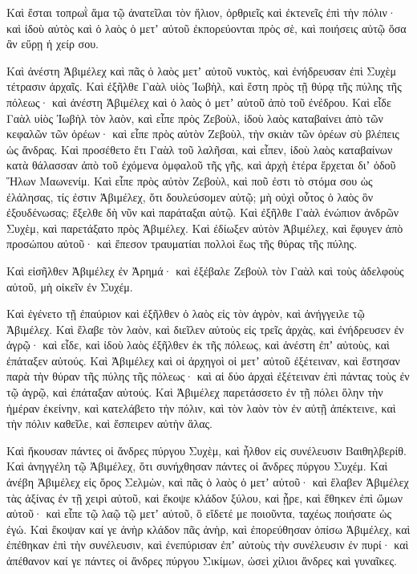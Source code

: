 {Καὶ ἔσται τοπρωῒ ἅμα τῷ ἀνατεῖλαι τὸν ἥλιον, ὀρθριεῖς καὶ ἐκτενεῖς ἐπὶ τὴν πόλιν· καὶ ἰδοὺ αὐτὸς καὶ ὁ λαὸς ὁ μετʼ αὐτοῦ ἐκπορεύονται πρὸς σὲ, καὶ ποιήσεις αὐτῷ ὅσα ἂν εὕρῃ ἡ χείρ σου.
\par }{\PP {}Καὶ ἀνέστη Ἀβιμέλεχ καὶ πᾶς ὁ λαὸς μετʼ αὐτοῦ νυκτὸς, καὶ ἐνήδρευσαν ἐπὶ Συχὲμ τέτρασιν ἀρχαῖς.
Καὶ ἐξῆλθε Γαὰλ υἱὸς Ἰωβὴλ, καὶ ἔστη πρὸς τῇ θύρᾳ τῆς πύλης τῆς πόλεως· καὶ ἀνέστη Ἀβιμέλεχ καὶ ὁ λαὸς ὁ μετʼ αὐτοῦ ἀπὸ τοῦ ἐνέδρου.
Καὶ εἶδε Γαὰλ υἱὸς Ἰωβὴλ τὸν λαὸν, καὶ εἶπε πρὸς Ζεβοὺλ, ἰδοὺ λαὸς καταβαίνει ἀπὸ τῶν κεφαλῶν τῶν ὀρέων· καὶ εἶπε πρὸς αὐτὸν Ζεβοὺλ, τὴν σκιὰν τῶν ὀρέων σὺ βλέπεις ὡς ἄνδρας.
Καὶ προσέθετο ἔτι Γαὰλ τοῦ λαλῆσαι, καὶ εἶπεν, ἰδοὺ λαὸς καταβαίνων κατὰ θάλασσαν ἀπὸ τοῦ ἐχόμενα ὀμφαλοῦ τῆς γῆς, καὶ ἀρχὴ ἑτέρα ἔρχεται διʼ ὁδοῦ Ἥλων Μαωνενίμ.
Καὶ εἶπε πρὸς αὐτὸν Ζεβοὺλ, καὶ ποῦ ἐστι τὸ στόμα σου ὡς ἐλάλησας, τίς ἐστιν Ἀβιμέλεχ, ὅτι δουλεύσομεν αὐτῷ; μὴ οὐχὶ οὗτος ὁ λαὸς ὃν ἐξουδένωσας; ἔξελθε δὴ νῦν καὶ παράταξαι αὐτῷ.
Καὶ ἐξῆλθε Γαὰλ ἐνώπιον ἀνδρῶν Συχὲμ, καὶ παρετάξατο πρὸς Ἀβιμέλεχ.
Καὶ ἐδίωξεν αὐτὸν Ἀβιμέλεχ, καὶ ἔφυγεν ἀπὸ προσώπου αὐτοῦ· καὶ ἔπεσον τραυματίαι πολλοὶ ἕως τῆς θύρας τῆς πύλης.
\par }{\PP {}Καὶ εἰσῆλθεν Ἀβιμέλεχ ἐν Ἀρημά· καὶ ἐξέβαλε Ζεβοὺλ τὸν Γαὰλ καὶ τοὺς ἀδελφοὺς αὐτοῦ, μὴ οἰκεῖν ἐν Συχέμ.
\par }{\PP {}Καὶ ἐγένετο τῇ ἐπαύριον καὶ ἐξῆλθεν ὁ λαὸς εἰς τὸν ἀγρὸν, καὶ ἀνήγγειλε τῷ Ἀβιμέλεχ.
Καὶ ἔλαβε τὸν λαὸν, καὶ διεῖλεν αὐτοὺς εἰς τρεῖς ἀρχὰς, καὶ ἐνήδρευσεν ἐν ἀγρῷ· καὶ εἶδε, καὶ ἰδοὺ λαὸς ἐξῆλθεν ἐκ τῆς πόλεως, καὶ ἀνέστη ἐπʼ αὐτοὺς, καὶ ἐπάταξεν αὐτούς.
Καὶ Ἀβιμέλεχ καὶ οἱ ἀρχηγοὶ οἱ μετʼ αὐτοῦ ἐξέτειναν, καὶ ἔστησαν παρὰ τὴν θύραν τῆς πύλης τῆς πόλεως· καὶ αἱ δύο ἀρχαὶ ἐξέτειναν ἐπὶ πάντας τοὺς ἐν τῷ ἀγρῷ, καὶ ἐπάταξαν αὐτούς.
Καὶ Ἀβιμέλεχ παρετάσσετο ἐν τῇ πόλει ὅλην τὴν ἡμέραν ἐκείνην, καὶ κατελάβετο τὴν πόλιν, καὶ τὸν λαὸν τὸν ἐν αὐτῇ ἀπέκτεινε, καὶ τὴν πόλιν καθεῖλε, καὶ ἔσπειρεν αὐτὴν ἅλας.
\par }{\PP {}Καὶ ἤκουσαν πάντες οἱ ἄνδρες πύργου Συχὲμ, καὶ ἦλθον εἰς συνέλευσιν Βαιθηλβερίθ.
Καὶ ἀνηγγέλη τῷ Ἀβιμέλεχ, ὅτι συνήχθησαν πάντες οἱ ἄνδρες πύργου Συχέμ.
Καὶ ἀνέβη Ἀβιμέλεχ εἰς ὄρος Σελμὼν, καὶ πᾶς ὁ λαὸς ὁ μετʼ αὐτοῦ· καὶ ἔλαβεν Ἀβιμέλεχ τὰς ἀξίνας ἐν τῇ χειρὶ αὐτοῦ, καὶ ἔκοψε κλάδον ξύλου, καὶ ᾖρε, καὶ ἔθηκεν ἐπὶ ὤμων αὐτοῦ· καὶ εἶπε τῷ λαῷ τῷ μετʼ αὐτοῦ, ὃ εἴδετέ με ποιοῦντα, ταχέως ποιήσατε ὡς ἐγώ.
Καὶ ἔκοψαν καί γε ἀνὴρ κλάδον πᾶς ἀνὴρ, καὶ ἐπορεύθησαν ὀπίσω Ἀβιμέλεχ, καὶ ἐπέθηκαν ἐπὶ τὴν συνέλευσιν, καὶ ἐνεπύρισαν ἐπʼ αὐτοὺς τὴν συνέλευσιν ἐν πυρί· καὶ ἀπέθανον καί γε πάντες οἱ ἄνδρες πύργου Σικίμων, ὡσεὶ χίλιοι ἄνδρες καὶ γυναῖκες.
}
